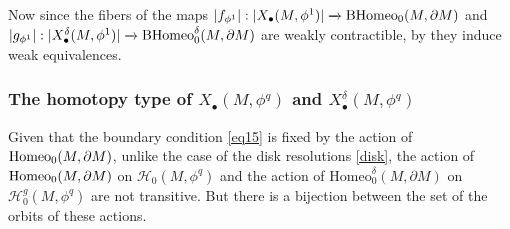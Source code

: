 \documentclass[a4paper]{amsart}
\theoremstyle{definition}
\theoremstyle{remark}
\newcommand{\tH}{\text{\textnormal{Homeo}}}
\newcommand{\BH}{\mathrm{B}\text{\textnormal{Homeo}}}
\newcommand{\tdH}{\text{Homeo}^{\delta}}
\newcommand{\BdH}{\mathrm{B}\text{\textnormal{Homeo}}^{\delta}}
\numberwithin{equation}{section}
\begin{document}
Now since the fibers of  the maps $|f_{\phi^1}|: |X_{\bullet}(M,\phi^1)|\xrightarrow{} \BH_0(M,\partial M)$ and $|g_{\phi^1}|:|X^{\delta}_{\bullet}(M,\phi^1)|\xrightarrow{} \BdH_0(M,\partial M)$ are weakly contractible, by  \cite[Lemma 2.1]{randal2009resolutions} they induce weak equivalences. 

\subsubsection{The homotopy type of $X_{\bullet}(M,\phi^q)$ and $X^{\delta}_{\bullet}(M,\phi^q)$}Given that the boundary condition \ref{eq15} is fixed by the action of $\tH_0(M,\partial M)$, unlike the case of the disk resolutions \ref{disk}, the action of $\tH_0(M,\partial M)$ on $\mathcal{H}_{0}(M,\phi^q)$ and the action of $\tdH_0(M,\partial M)$ on $\mathcal{H}^g_{0}(M,\phi^q)$ are not transitive. But there is a bijection between the set of the orbits of these actions.
\end{document}

